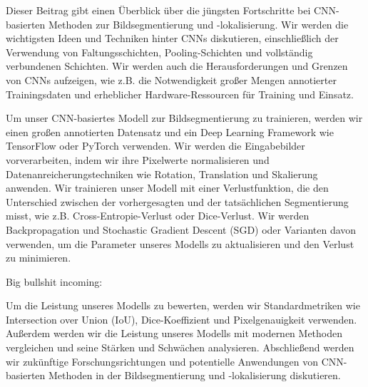         Dieser Beitrag gibt einen Überblick über die jüngsten Fortschritte bei CNN-basierten Methoden zur
        Bildsegmentierung und -lokalisierung. Wir werden die wichtigsten Ideen und Techniken hinter CNNs diskutieren,
        einschließlich der Verwendung von Faltungsschichten, Pooling-Schichten und vollständig verbundenen Schichten.
        Wir werden auch die Herausforderungen und Grenzen von CNNs aufzeigen, wie z.B. die Notwendigkeit großer
        Mengen annotierter Trainingsdaten und erheblicher Hardware-Ressourcen für Training und Einsatz.

        Um unser CNN-basiertes Modell zur Bildsegmentierung zu trainieren, werden wir einen großen annotierten
        Datensatz und ein Deep Learning Framework wie TensorFlow oder PyTorch verwenden. Wir werden die Eingabebilder
        vorverarbeiten, indem wir ihre Pixelwerte normalisieren und Datenanreicherungstechniken wie Rotation,
        Translation und Skalierung anwenden. Wir trainieren unser Modell mit einer Verlustfunktion, die den
        Unterschied zwischen der vorhergesagten und der tatsächlichen Segmentierung misst, wie z.B.
        Cross-Entropie-Verlust oder Dice-Verlust. Wir werden Backpropagation und Stochastic Gradient Descent (SGD)
        oder Varianten davon verwenden, um die Parameter unseres Modells zu aktualisieren und den Verlust zu minimieren.

        Big bullshit incoming:

        Um die Leistung unseres Modells zu bewerten, werden wir Standardmetriken wie Intersection over Union (IoU),
        Dice-Koeffizient und Pixelgenauigkeit verwenden. Außerdem werden wir die Leistung unseres Modells mit
        modernen Methoden vergleichen und seine Stärken und Schwächen analysieren. Abschließend werden wir zukünftige
        Forschungsrichtungen und potentielle Anwendungen von CNN-basierten Methoden in der Bildsegmentierung und
        -lokalisierung diskutieren.
